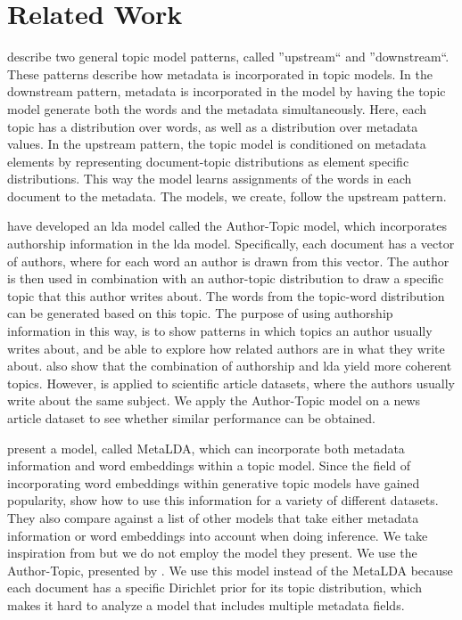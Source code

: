 \section{Related Work}\label{sec:related_work}
\citet{mimno2008topic} describe two general topic model patterns, called ''upstream`` and ''downstream``.
These patterns describe how metadata is incorporated in topic models.
In the downstream pattern, metadata is incorporated in the model by having the topic model generate both the words and the metadata simultaneously.
Here, each topic has a distribution over words, as well as a distribution over metadata values.
In the upstream pattern, the topic model is conditioned on metadata elements by representing document-topic distributions as element specific distributions.
This way the model learns assignments of the words in each document to the metadata.
The models, we create, follow the upstream pattern.

\citet{author_topic_2012} have developed an \gls{lda} model called the Author-Topic model, which incorporates authorship information in the \gls{lda} model.
Specifically, each document has a vector of authors, where for each word an author is drawn from this vector.
The author is then used in combination with an author-topic distribution to draw a specific topic that this author writes about.
The words from the topic-word distribution can be generated based on this topic.
The purpose of using authorship information in this way, is to show patterns in which topics an author usually writes about, and be able to explore how related authors are in what they write about.
\citeauthor{author_topic_2012} also show that the combination of authorship and \gls{lda} yield more coherent topics.
However, \citet{author_topic_2012} is applied to scientific article datasets, where the authors usually write about the same subject.
We apply the Author-Topic model on a news article dataset to see whether similar performance can be obtained.

\citet{MetaLDA2017} present a model, called MetaLDA, which can incorporate both metadata information and word embeddings within a topic model.
Since the field of incorporating word embeddings within generative topic models have gained popularity\cite{dieng2020topic}, \citet{MetaLDA2017} show how to use this information for a variety of different datasets.
They also compare against a list of other models that take either metadata information or word embeddings into account when doing inference.
We take inspiration from \citet{MetaLDA2017} but we do not employ the model they present.
We use the Author-Topic, presented by \citet{author_topic_2012}. 
We use this model instead of the MetaLDA because each document has a specific Dirichlet prior for its topic distribution, which makes it hard to analyze a model that includes multiple metadata fields.

